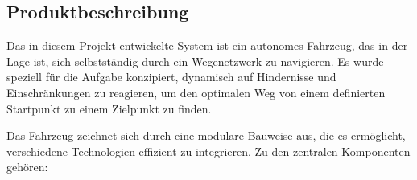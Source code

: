 \documentclass[main.tex]{subfiles} %
\begin{document}

\subsection{Produktbeschreibung}

Das in diesem Projekt entwickelte System ist ein autonomes Fahrzeug, das in der Lage ist, sich selbstständig durch ein Wegenetzwerk zu navigieren. Es wurde speziell für die Aufgabe konzipiert, dynamisch auf Hindernisse und Einschränkungen zu reagieren, um den optimalen Weg von einem definierten Startpunkt zu einem Zielpunkt zu finden.

Das Fahrzeug zeichnet sich durch eine modulare Bauweise aus, die es ermöglicht, verschiedene Technologien effizient zu integrieren. Zu den zentralen Komponenten gehören:
\end{document}
